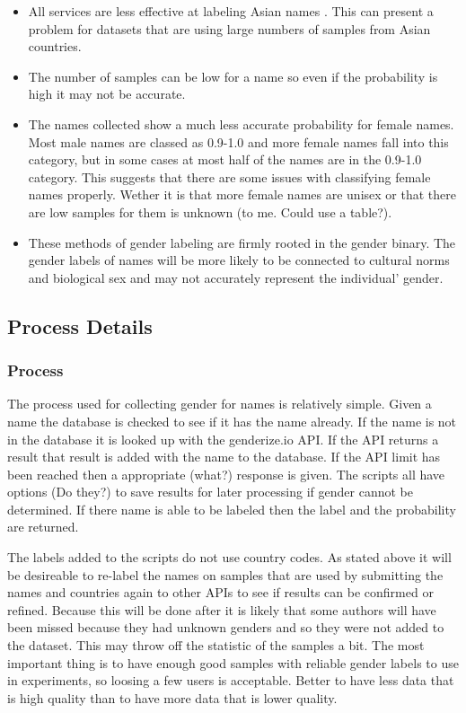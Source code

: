 \documentclass{article}
\begin{document}
\begin{itemize}
    \item All services are less effective at labeling Asian names \cite{Santamaria2018}. This can present a problem for datasets that are using large numbers of samples from Asian countries.

    \item The number of samples can be low for a name so even if the probability is high it may not be accurate.

    \item The names collected show a much less accurate probability for female names. Most male names are classed as 0.9-1.0 and more female names fall into this category, but in some cases at most half of the names are in the 0.9-1.0 category. This suggests that there are some issues with classifying female names properly. Wether it is that more female names are unisex or that there are low samples for them is unknown (to me. Could use a table?).
    
    \item These methods of gender labeling are firmly rooted in the gender binary. The gender labels of names will be more likely to be connected to cultural norms and biological sex and may not accurately represent the individual' gender.
\end{itemize}


\subsection{Process Details}
\subsubsection{Process}
The process used for collecting gender for names is relatively simple. Given a name the database is checked to see if it has the name already. If the name is not in the database it is looked up with the genderize.io API. If the API returns a result that result is added with the name to the database. If the API limit has been reached then a appropriate (what?) response is given. The scripts all have options (Do they?) to save results for later processing if gender cannot be determined. If there name is able to be labeled then the label and the probability are returned.

The labels added to the scripts do not use country codes. As stated above it will be desireable to re-label the names on samples that are used by submitting the names and countries again to other APIs to see if results can be confirmed or refined. Because this will be done after it is likely that some authors will have been missed because they had unknown genders and so they were not added to the dataset. This may throw off the statistic of the samples a bit. The most important thing is to have enough good samples with reliable gender labels to use in experiments, so loosing a few users is acceptable. Better to have less data that is high quality than to have more data that is lower quality.
\end{document}
